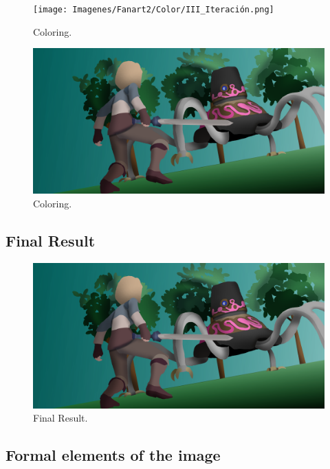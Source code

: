 \documentclass{cup-pan}
\begin{document}
        \begin{figure}[H]
            \texttt{[image: Imagenes/Fanart2/Color/III\_Iteración.png]}
            \caption{Coloring.}
        \end{figure}

        \begin{figure}[H]
            \includegraphics[width=\textwidth]{Imagenes/Fanart2/Color/IIII_Iteracion.png}
            \caption{Coloring.}
        \end{figure}

    \subsection{Final Result}

        \begin{figure}[H]
            \includegraphics[width=\textwidth]{Imagenes/Fanart2/Color/IIII_Iteracion.png}
            \caption{Final Result.}
        \end{figure}

    \subsection{Formal elements of the image}
        
\end{document}
